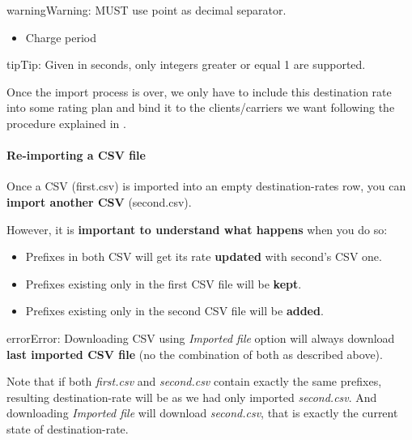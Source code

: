 \documentclass[letterpaper,10pt,english]{sphinxmanual}
\begin{document}
\begin{notice}{warning}{Warning:}
MUST use point as decimal separator.
\end{notice}
\begin{itemize}
\item {} 
Charge period

\end{itemize}

\begin{notice}{tip}{Tip:}
Given in seconds, only integers greater or equal 1 are supported.
\end{notice}

Once the import process is over, we only have to include this destination rate into some
rating plan and bind it to the clients/carriers we want following the procedure explained in
{\hyperref[administration_portal/brand/billing/rating_plans:rating\string-plans]{}}.


\paragraph{Re-importing a CSV file}
\label{administration_portal/brand/billing/destination_rates:re-importing-a-csv-file}
Once a CSV (first.csv) is imported into an empty destination-rates row, you can \textbf{import another CSV} (second.csv).

However, it is \textbf{important to understand what happens} when you do so:
\begin{itemize}
\item {} 
Prefixes in both CSV will get its rate \textbf{updated} with second's CSV one.

\item {} 
Prefixes existing only in the first CSV file will be \textbf{kept}.

\item {} 
Prefixes existing only in the second CSV file will be \textbf{added}.

\end{itemize}

\begin{notice}{error}{Error:}
Downloading CSV using \emph{Imported file} option will always download \textbf{last imported CSV file} (no the
combination of both as described above).
\end{notice}

Note that if both \emph{first.csv} and \emph{second.csv} contain exactly the same prefixes, resulting destination-rate will be as
we had only imported \emph{second.csv}. And downloading \emph{Imported file} will download \emph{second.csv}, that is exactly the current
state of destination-rate.
\end{document}
